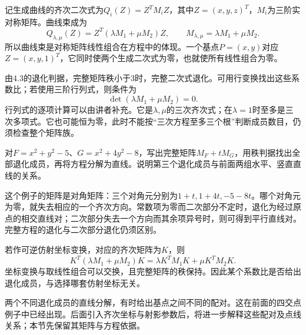 记生成曲线的齐次二次式为\(Q_i(Z)=Z^TM_iZ\)，其中\(Z=(x,y,z)^T\)，\(M_i\)为三阶实对称矩阵。曲线束成为
\begin{equation}\label{eq:quadratic-matrix-pencil}
    Q_{\lambda,\mu}(Z)=Z^T(\lambda M_1+\mu M_2)Z,
    \qquad M_{\lambda,\mu}=\lambda M_1+\mu M_2 .
\end{equation}
所以曲线束是对称矩阵线性组合在方程中的体现。一个基点\(P=(x,y)\)对应\(Z=(x,y,1)^T\)，它同时使两个生成二次式为零，也就使所有线性组合为零。

由4.3的退化判据，完整矩阵秩小于\(3\)时，完整二次式退化。可用行变换找出这些系数比；若使用三阶行列式，则条件为
\begin{equation*}
    \det(\lambda M_1+\mu M_2)=0 .
\end{equation*}
行列式的逐项计算可以由讲者补充。它是\(\lambda,\mu\)的三次齐次式；在\(\lambda=1\)时至多是三次多项式。它也可能恒为零，此时不能按“三次方程至多三个根”判断成员数目，仍须检查整个矩阵族。

\par\noindent\begin{minipage}{\linewidth}
\begin{example}
对\(F=x^2+y^2-5\)、\(G=x^2+4y^2-8\)，写出完整矩阵\(M_F+tM_G\)，用秩判据找出全部退化成员，再将方程分解为直线。说明第三个退化成员与前面两组水平、竖直直线的关系。
\end{example}
\end{minipage}\par


这个例子的矩阵是对角矩阵：三个对角元分别为\(1+t,1+4t,-5-8t\)。哪个对角元为零，就失去相应的一个齐次方向。常数项为零而二次部分不定时，退化为经过原点的相交直线对；二次部分失去一个方向而其余项异号时，则可得到平行直线对。完整方程的退化与二次部分退化仍须区别。

若作可逆仿射坐标变换，对应的齐次矩阵为\(K\)，则
\begin{equation*}
    K^T(\lambda M_1+\mu M_2)K
    =\lambda K^TM_1K+\mu K^TM_2K .
\end{equation*}
坐标变换与取线性组合可以交换，且完整矩阵的秩保持。因此某个系数比是否给出退化成员，与选择哪套仿射坐标无关。

两个不同退化成员的直线分解，有时给出基点之间不同的配对。这在前面的四交点例子中已经出现。后面引入齐次坐标与射影参数后，将进一步解释这些配对及点线关系；本节先保留其矩阵与方程依据。

